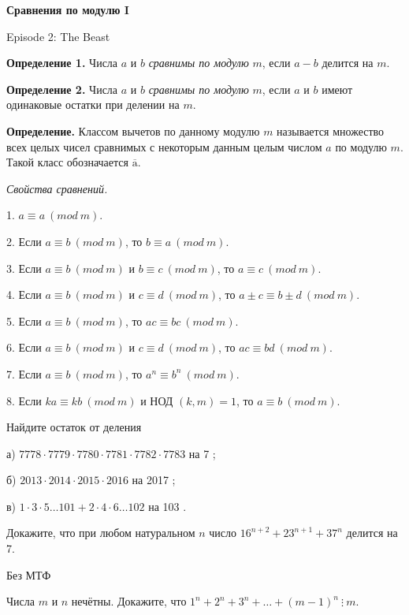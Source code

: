 \centerline{\bf \Huge Сравнения по модулю I}

\begin{flushright}
        \scriptsize{Episode 2: The Beast}
\end{flushright}

\textbf{Определение 1.} Числа $a$ и $b$ \textit{сравнимы по модулю} $m$, если $a-b$ делится на $m$.

\textbf{Определение 2.} Числа $a$ и $b$ \textit{сравнимы по модулю} $m$, если $a$ и $b$ имеют одинаковые остатки при делении на $m$.

\textbf{Определение.} Классом вычетов по данному модулю $m$ называется множество всех целых чисел сравнимых с некоторым данным целым числом $a$ по модулю $m$. Такой класс обозначается $\overline{\mathrm{a}}$.

\centerline{\it Свойства сравнений.}

1. $a \equiv a\ (mod\ m)$.

2. Если $a \equiv b\ (mod\ m)$, то $b \equiv a\ (mod\ m)$.

3. Если $a \equiv b\ (mod\ m)$ и $b \equiv c\ (mod\ m)$, то $a \equiv c\ (mod\ m)$.

4. Если $a \equiv b\ (mod\ m)$ и $c \equiv d\ (mod\ m)$, то $a \pm c \equiv b \pm d\ (mod\ m)$.

5. Если $a \equiv b\ (mod\ m)$, то $a c \equiv b c\ (mod\ m)$.

6. Если $a \equiv b\ (mod\ m)$ и $c \equiv d\ (mod\ m)$, то $a c \equiv b d\ (mod\ m)$.

7. Если $a \equiv b\ (mod\ m)$, то $a^n \equiv b^n\ (mod\ m)$.

8. Если $k a \equiv k b\ (mod\ m)$ и НОД $(k, m)=1$, то $a \equiv b\ (mod\ m)$.

Найдите остаток от деления

а) $7778 \cdot 7779 \cdot 7780 \cdot 7781 \cdot 7782 \cdot 7783$ на 7 ;

б) $2013 \cdot 2014 \cdot 2015 \cdot 2016$ на 2017 ;

в) $1 \cdot 3 \cdot 5 \ldots 101+2 \cdot 4 \cdot 6 \ldots 102$ на 103 .


Докажите, что при любом натуральном $n$ число $16^{n+2}+23^{n+1}+37^n$ делится на 7.

\begin{flushright}
        \scriptsize{Без МТФ}
\end{flushright}

Числа $m$ и $n$ нечётны. Докажите, что $1^n+2^n+3^n+\ldots+(m-1)^n \ \vdots \ m$.

